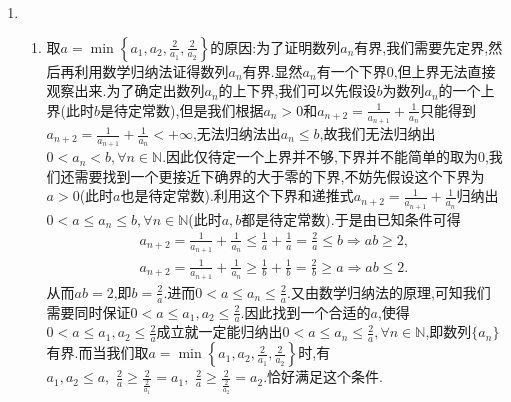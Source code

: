 \documentclass[../../main.tex]{subfiles}
\begin{document}
\begin{remark}
\begin{enumerate}
\item 
\begin{enumerate}[(1)]
\item  \label{example3.24(1)}
取$a=\min \left\{ a_1,a_2,\frac{2}{a_1},\frac{2}{a_2} \right\}$的原因:为了证明数列${a_n}$有界,我们需要先定界,然后再利用数学归纳法证得数列${a_n}$有界.显然${a_n}$有一个下界0,但上界无法直接观察出来.为了确定出数列${a_n}$的上下界,我们可以先假设$b$为数列${a_n}$的一个上界(此时$b$是待定常数),但是我们根据$a_n>0$和$a_{n+2}=\frac{1}{a_{n+1}}+\frac{1}{a_n}$只能得到$a_{n+2}=\frac{1}{a_{n+1}}+\frac{1}{a_n}<+\infty$,无法归纳法出$a_n\leqslant  b$,故我们无法归纳出$0<a_n<b,\forall n\in\mathbb{N}$.因此仅待定一个上界并不够,下界并不能简单的取为0,我们还需要找到一个更接近下确界的大于零的下界,不妨先假设这个下界为$a>0$(此时$a$也是待定常数).利用这个下界和递推式$a_{n+2}=\frac{1}{a_{n+1}}+\frac{1}{a_n}$归纳出$0<a\leqslant  a_n\leqslant  b,\forall n\in\mathbb{N}$(此时$a,b$都是待定常数).于是由已知条件可得
\begin{gather*}
a_{n+2}=\frac{1}{a_{n+1}}+\frac{1}{a_n}\leqslant \frac{1}{a}+\frac{1}{a}=\frac{2}{a}\leqslant b\Rightarrow ab\geqslant 2,
\\
a_{n+2}=\frac{1}{a_{n+1}}+\frac{1}{a_n}\geqslant \frac{1}{b}+\frac{1}{b}=\frac{2}{b}\geqslant a\Rightarrow ab\leqslant 2.
\end{gather*}
从而$ab=2$,即$b=\frac{2}{a}$.进而$0<a\leqslant  a_n\leqslant \frac{2}{a}$.又由数学归纳法的原理,可知我们需要同时保证$0<a\leqslant  a_1,a_2\leqslant  \frac{2}{a}$.因此找到一个合适的$a$,使得$0<a\leqslant  a_1,a_2\leqslant  \frac{2}{a}$成立就一定能归纳出$0<a\leqslant  a_n\leqslant  \frac{2}{a},\forall n\in\mathbb{N}$,即数列$\{a_n\}$有界.而当我们取$a=\min \left\{ a_1,a_2,\frac{2}{a_1},\frac{2}{a_2} \right\}$时,有$a_1,a_2\leqslant a,\,\,\frac{2}{a}\ge \frac{2}{\frac{2}{a_1}}=a_1,\,\,\frac{2}{a}\ge \frac{2}{\frac{2}{a_2}}=a_2.$恰好满足这个条件.


\end{enumerate}
\end{enumerate}
\end{remark}
\end{document}
